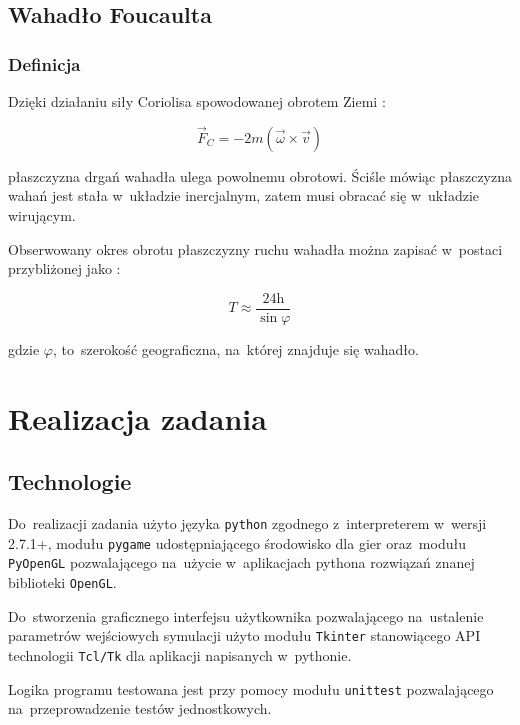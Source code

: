 \documentclass{classrep}
\begin{document}
\subsection{Wahadło Foucaulta}

\subsubsection{Definicja}

Dzięki działaniu siły Coriolisa spowodowanej obrotem Ziemi \cite{tablice}:

\begin{equation}
  \vec{F}_C = -2m(\vec{\omega} \times \vec{v})
\end{equation}

płaszczyzna drgań wahadła ulega powolnemu obrotowi. Ściśle mówiąc płaszczyzna
wahań jest stała w~układzie inercjalnym, zatem musi obracać się w~układzie
wirującym.


Obserwowany okres obrotu płaszczyzny ruchu wahadła można zapisać
w~postaci przybliżonej jako \cite{tablice}:

\begin{equation}
  T \approx \frac{24 \mathrm{h}}{\sin\varphi}
\end{equation}

gdzie $ \varphi $, to~szerokość geograficzna, na~której znajduje się wahadło.

\section{Realizacja zadania}

\subsection{Technologie}

Do~realizacji zadania użyto języka \texttt{python} zgodnego z~interpreterem
w~wersji 2.7.1+, modułu \texttt{pygame} udostępniającego środowisko dla gier
oraz~modułu \texttt{PyOpenGL} pozwalającego na~użycie w~aplikacjach pythona
rozwiązań znanej biblioteki \texttt{OpenGL}.


Do~stworzenia graficznego interfejsu użytkownika pozwalającego na~ustalenie
parametrów wejściowych symulacji użyto modułu \texttt{Tkinter} stanowiącego
API technologii \texttt{Tcl/Tk} dla aplikacji napisanych w~pythonie.


Logika programu testowana jest przy pomocy modułu \texttt{unittest} pozwalającego
na~przeprowadzenie testów jednostkowych.
\end{document}
